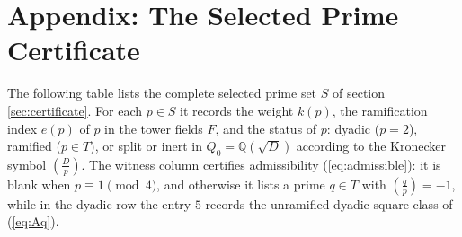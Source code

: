 \section*{Appendix: The Selected Prime Certificate}

The following table lists the complete selected prime set $S$ of section
\ref{sec:certificate}. For each $p\in S$ it records the weight $k(p)$,
the ramification index $e(p)$ of $p$ in the tower fields $F$, and the
status of $p$: dyadic ($p=2$), ramified ($p\in T$), or split or inert in
$Q_{0}=\mathbb{Q}(\sqrt{D})$ according to the Kronecker symbol
$\left(\frac{D}{p}\right)$. The witness column certifies admissibility
(\ref{eq:admissible}): it is blank when $p\equiv1\pmod4$, and otherwise
it lists a prime $q\in T$ with $\left(\frac{q}{p}\right)=-1$, while in
the dyadic row the entry $5$ records the unramified dyadic square class
of (\ref{eq:Aq}).

